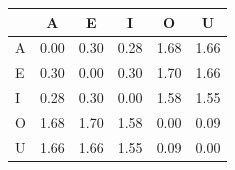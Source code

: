 \begin{tabular}{lccccc}
\toprule
\rowcolor{col01}
 & A & E & I & O & U \\
\midrule
A & 0.00 & 0.30 & 0.28 & 1.68 & 1.66 \\
E & 0.30 & 0.00 & 0.30 & 1.70 & 1.66 \\
I & 0.28 & 0.30 & 0.00 & 1.58 & 1.55 \\
O & 1.68 & 1.70 & 1.58 & 0.00 & 0.09 \\
U & 1.66 & 1.66 & 1.55 & 0.09 & 0.00 \\
\bottomrule
\end{tabular}
